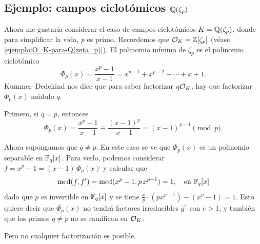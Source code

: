 \subsection{Ejemplo: campos ciclotómicos \texorpdfstring{$\mathbb{Q} (\zeta_p)$}{ℚ(ζₚ)}}

Ahora me gustaría considerar el caso de campos ciclotómicos $K = \mathbb{Q} (\zeta_p)$,
donde para simplificar la vida, $p$ es primo. Recordemos que
$\mathcal{O}_K = \mathbb{Z} [\zeta_p]$ (véase \ref{ejemplo:O_K-para-Q(zeta_p)}). El polinomio
mínimo de $\zeta_p$ es el polinomio ciclotómico
$$\Phi_p (x) = \frac{x^p - 1}{x-1} = x^{p-1} + x^{p-2} + \cdots + x + 1.$$
Kummer--Dedekind nos dice que para saber factorizar $q\mathcal{O}_K$, hay que
factorizar $\Phi_p (x)$ módulo $q$.

Primero, si $q = p$, entonces
\[ \Phi_p (x) = \frac{x^p - 1}{x-1} \equiv \frac{(x - 1)^p}{x-1} =
   (x-1)^{p-1} \pmod{p}. \]

Ahora supongamos que $q \ne p$. En este caso se ve que $\Phi_p (x)$ es un
polinomio separable en $\mathbb{F}_q [x]$. Para verlo, podemos considerar
$f = x^p - 1 = (x-1)\,\Phi_p (x)$ y calcular que
$$\operatorname{mcd} (f,f') = \operatorname{mcd} (x^p - 1, p\,x^{p-1}) = 1, \quad \text{en }\mathbb{F}_q [x]$$
dado que $p$ es invertible en $\mathbb{F}_q [x]$ y se tiene
$\frac{x}{p} \cdot (p x^{p-1}) - (x^p - 1) = 1$. Esto quiere decir que
$\overline{\Phi_p} (x)$ no tendrá factores irreducibles $\overline{g}^e$ con
$e > 1$, y también que los primos $q \ne p$ no se ramifican en $\mathcal{O}_K$.

Pero no cualquier factorización es posible.

